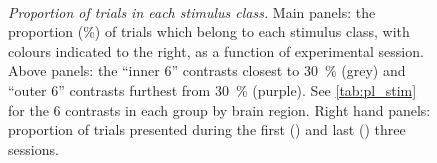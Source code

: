 \begin{figure}[htbp]%
    \centering
    \hspace*{\fill}
    \hspace*{\fill}\hspace{.2cm}\hspace*{\fill}
    \hspace*{\fill}
    \\
    \hspace*{\fill}
    \hspace*{\fill}\hspace{.2cm}\hspace*{\fill}
    \hspace*{\fill}
    \caption{\textit{Proportion of trials in each stimulus class.}
Main panels: the proportion (\%) of trials which belong to each stimulus class, with colours indicated to the right, as a function of experimental session.
Above panels: the ``inner \num{6}'' contrasts closest to \SI{30}{\percent} (grey) and ``outer \num{6}'' contrasts furthest from \SI{30}{\percent} (purple).
See \autoref{tab:pl_stim} for the \num{6} contrasts in each group by brain region.
Right hand panels: proportion of trials presented during the first () and last () three sessions.
}
    \label{fig:class_balance}
\end{figure}


